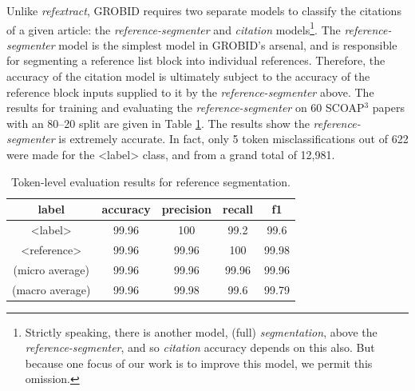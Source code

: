 Unlike \emph{refextract}, GROBID requires two separate models to classify the citations of a given article: the \emph{reference-segmenter} and \emph{citation} models\footnote{Strictly speaking, there is another model, (full) \emph{segmentation}, above the \emph{reference-segmenter}, and so \emph{citation} accuracy depends on this also. But because one focus of our work is to improve this model, we permit this omission.}. The \emph{reference-segmenter} model is the simplest model in GROBID's arsenal, and is responsible for segmenting a reference list block into individual references. Therefore, the accuracy of the citation model is ultimately subject to the accuracy of the reference block inputs supplied to it by the \emph{reference-segmenter} above. The results for training and evaluating the \emph{reference-segmenter} on 60 SCOAP$^3$ papers with an 80--20 split are given in Table \ref{table:referencesegmenterresults}. The results show the \emph{reference-segmenter} is extremely accurate. In fact, only 5 token misclassifications out of 622 were made for the <label> class, and from a grand total of 12,981.

\label{subsec:refextract}
\begin{table}[h]
\begin{center}
\begin{tabular}{|c|cccc|}
\hline
label           & accuracy  & precision  & recall   & f1 \\
\hline
<label>         & 99.96     & 100        & 99.2     & 99.6\\
<reference>     & 99.96     & 99.96      & 100      & 99.98\\
\hline
(micro average) & 99.96     & 99.96      & 99.96    & 99.96  \\
(macro average) & 99.96     & 99.98      & 99.6     & 99.79  \\
\hline
\end{tabular}
\caption[Token-level evaluation results for reference segmentation.]{Token-level evaluation results for reference segmentation.}
\label{table:referencesegmenterresults}
\end{center}
\end{table}

